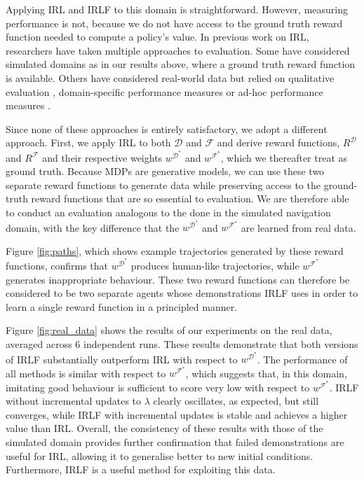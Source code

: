 \documentclass[a4paper,11pt]{report}
\begin{document}
Applying IRL and IRLF to this domain is straightforward.  However, measuring performance is not, because we do not have access to the ground truth reward function needed to compute a policy's value. In previous work on IRL, researchers have taken multiple approaches to evaluation.  Some have considered simulated domains \cite{levine2011nonlinear,syed2007game,rothkopf2011preference} as in our results above, where a ground truth reward function is available. Others have considered real-world data but relied on qualitative evaluation \cite{ratliff2006maximum}, domain-specific performance measures \cite{neu2009training} or ad-hoc performance measures \cite{vasquez2014inverse}.

Since none of these approaches is entirely satisfactory, we adopt a different approach. First, we apply IRL to both $\mathcal{D}$ and $\mathcal{F}$ and derive reward functions, $R^{\mathcal{D}}$ and $R^{\mathcal{F}}$ and their respective weights $w^{\mathcal{D}^*}$ and $w^{\mathcal{F}^*}$, which we thereafter treat as ground truth.
Because MDPs are generative models, we can use these two separate reward functions to generate data while preserving access to the ground-truth reward functions that are so essential to evaluation. We are therefore able to conduct an evaluation analogous to the done in the simulated navigation domain, with the key difference that the $w^{\mathcal{D}^*}$ and $w^{\mathcal{F}^*}$ are learned from real data. 

Figure \ref{fig:paths}, which shows example trajectories generated by these reward functions, confirms that $w^{\mathcal{D}^*}$ produces human-like trajectories, while $w^{\mathcal{F}^*}$ generates inappropriate beha\-viour. These two reward functions can therefore be considered to be two separate agents whose demonstrations IRLF uses in order to learn a single reward function in a principled manner.

Figure \ref{fig:real_data} shows the results of our experiments on the real data, averaged across 6 independent runs. These results de\-monstrate that both versions of IRLF substantially outperform IRL with respect to $w^{\mathcal{D}^*}$.  The performance of all methods is similar with respect to $w^{\mathcal{F}^*}$, which suggests that, in this domain, imitating good behaviour is sufficient to score very low with respect to $w^{\mathcal{F}^*}$.  IRLF without incremental updates to $\lambda$ clearly oscillates, as expected, but still converges, while IRLF with incremental updates is stable and achieves a higher value than IRL.
%
Overall, the consistency of these results with those of the simulated domain provides further confirmation that failed demonstrations are useful for IRL, allowing it to generalise better to new initial conditions.  Furthermore, IRLF is a useful method for exploiting this data.
\end{document}
